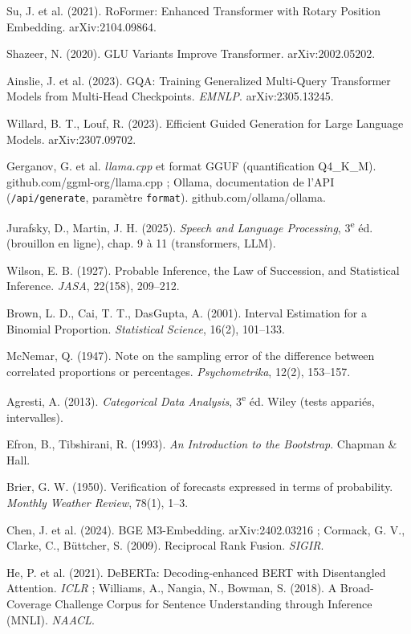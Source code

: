 \documentclass[11pt,a4paper]{article}
\begin{document}
\begin{enumerate}[label={[\arabic*]}]
\item Su, J. et al. (2021). RoFormer: Enhanced Transformer with Rotary Position Embedding. arXiv:2104.09864.
\item Shazeer, N. (2020). GLU Variants Improve Transformer. arXiv:2002.05202.
\item Ainslie, J. et al. (2023). GQA: Training Generalized Multi-Query Transformer Models from Multi-Head Checkpoints. \emph{EMNLP}. arXiv:2305.13245.
\item Willard, B. T., Louf, R. (2023). Efficient Guided Generation for Large Language Models. arXiv:2307.09702.
\item Gerganov, G. et al. \emph{llama.cpp} et format GGUF (quantification Q4\_K\_M). github.com/ggml-org/llama.cpp ; Ollama, documentation de l'API (\texttt{/api/generate}, paramètre \texttt{format}). github.com/ollama/ollama.
\item Jurafsky, D., Martin, J. H. (2025). \emph{Speech and Language Processing}, 3\textsuperscript{e} éd. (brouillon en ligne), chap. 9 à 11 (transformers, LLM).
\item Wilson, E. B. (1927). Probable Inference, the Law of Succession, and Statistical Inference. \emph{JASA}, 22(158), 209--212.
\item Brown, L. D., Cai, T. T., DasGupta, A. (2001). Interval Estimation for a Binomial Proportion. \emph{Statistical Science}, 16(2), 101--133.
\item McNemar, Q. (1947). Note on the sampling error of the difference between correlated proportions or percentages. \emph{Psychometrika}, 12(2), 153--157.
\item Agresti, A. (2013). \emph{Categorical Data Analysis}, 3\textsuperscript{e} éd. Wiley (tests appariés, intervalles).
\item Efron, B., Tibshirani, R. (1993). \emph{An Introduction to the Bootstrap}. Chapman \& Hall.
\item Brier, G. W. (1950). Verification of forecasts expressed in terms of probability. \emph{Monthly Weather Review}, 78(1), 1--3.
\item Chen, J. et al. (2024). BGE M3-Embedding. arXiv:2402.03216 ; Cormack, G. V., Clarke, C., Büttcher, S. (2009). Reciprocal Rank Fusion. \emph{SIGIR}.
\item He, P. et al. (2021). DeBERTa: Decoding-enhanced BERT with Disentangled Attention. \emph{ICLR} ; Williams, A., Nangia, N., Bowman, S. (2018). A Broad-Coverage Challenge Corpus for Sentence Understanding through Inference (MNLI). \emph{NAACL}.
\end{enumerate}
\end{document}

